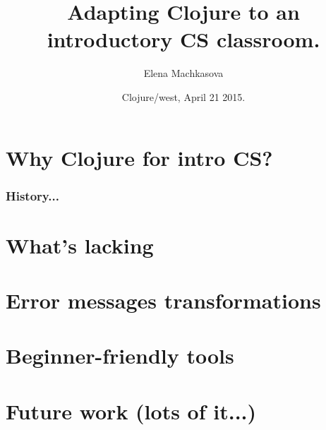 \documentclass{beamer}
\begin{document}
\title{Adapting Clojure to an introductory CS classroom.}
\author{Elena Machkasova}
\date[]  
{Clojure/west, April 21 2015.}

\begin{frame}
  \titlepage
\end{frame}

\section{Why Clojure for intro CS?}

\begin{frame}
   \frametitle{History...}
\end{frame}

\section{What's lacking}

\section{Error messages transformations}

\section{Beginner-friendly tools}

\section{Future work (lots of it...)}
\end{document}

